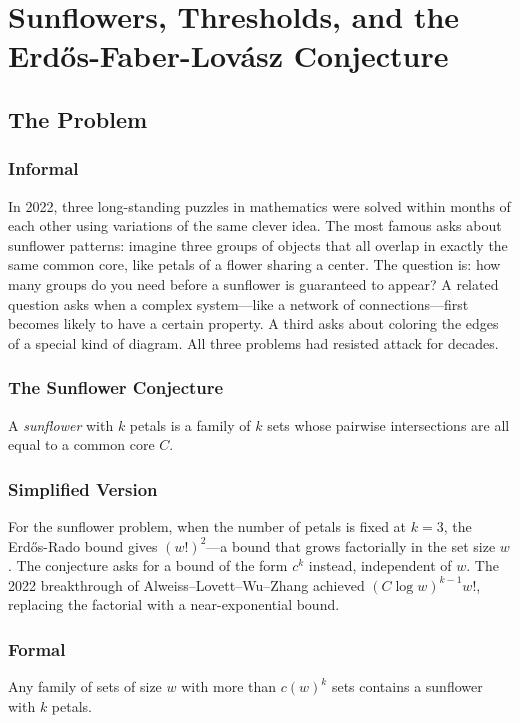 \let\LocalMacro\relax

\chapter{Sunflowers, Thresholds, and the Erd\H{o}s-Faber-Lov\'{a}sz Conjecture}

\section{The Problem}

\subsection{Informal}
In 2022, three long-standing puzzles in mathematics were solved within months of each other using variations of the same clever idea. The most famous asks about sunflower patterns: imagine three groups of objects that all overlap in exactly the same common core, like petals of a flower sharing a center. The question is: how many groups do you need before a sunflower is guaranteed to appear? A related question asks when a complex system---like a network of connections---first becomes likely to have a certain property. A third asks about coloring the edges of a special kind of diagram. All three problems had resisted attack for decades.

\subsection{The Sunflower Conjecture}
A \emph{sunflower} with $k$ petals is a family of $k$ sets whose pairwise intersections are all equal to a common core $C$.

\subsection{Simplified Version}
For the sunflower problem, when the number of petals is fixed at $k = 3$, the Erd\H{o}s-Rado bound gives $(w!)^2$---a bound that grows factorially in the set size $w$. The conjecture asks for a bound of the form $c^k$ instead, independent of $w$. The 2022 breakthrough of Alweiss--Lovett--Wu--Zhang achieved $(C \log w)^{k-1} w!$, replacing the factorial with a near-exponential bound.

\subsection{Formal}
\begin{conjecture}
Any family of sets of size $w$ with more than $c(w)^k$ sets contains a sunflower with $k$ petals.
\end{conjecture}

